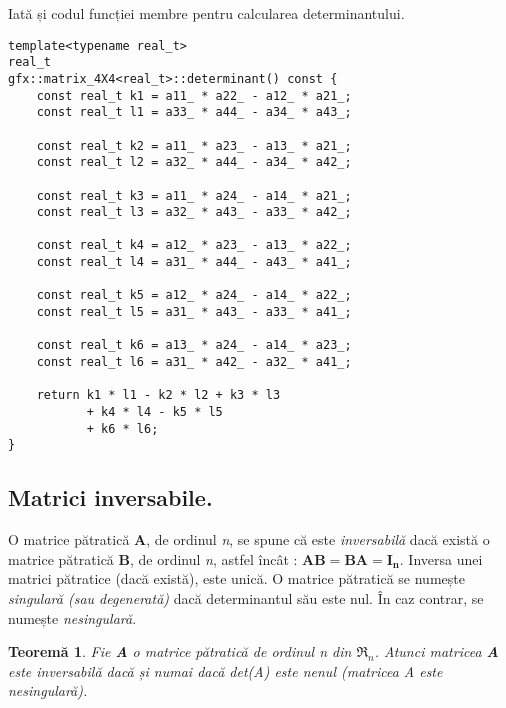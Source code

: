 \noindent
Iată și codul funcției membre pentru calcularea determinantului.
\begin{lstlisting}[]
template<typename real_t>
real_t
gfx::matrix_4X4<real_t>::determinant() const {
    const real_t k1 = a11_ * a22_ - a12_ * a21_;
    const real_t l1 = a33_ * a44_ - a34_ * a43_;

    const real_t k2 = a11_ * a23_ - a13_ * a21_;
    const real_t l2 = a32_ * a44_ - a34_ * a42_;

    const real_t k3 = a11_ * a24_ - a14_ * a21_;
    const real_t l3 = a32_ * a43_ - a33_ * a42_;

    const real_t k4 = a12_ * a23_ - a13_ * a22_;
    const real_t l4 = a31_ * a44_ - a43_ * a41_;

    const real_t k5 = a12_ * a24_ - a14_ * a22_;
    const real_t l5 = a31_ * a43_ - a33_ * a41_;

    const real_t k6 = a13_ * a24_ - a14_ * a23_;
    const real_t l6 = a31_ * a42_ - a32_ * a41_;

    return k1 * l1 - k2 * l2 + k3 * l3 
           + k4 * l4 - k5 * l5 
           + k6 * l6;
}

\end{lstlisting}

\subsection{Matrici inversabile.}
\label{ch1:sec_matrix:sub_matrix_inverse}

O matrice pătratică \textbf{A}, de ordinul \textit{n}, se spune că este
\textit{inversabilă} dacă există o matrice pătratică \textbf{B}, de ordinul
\textit{n}, astfel încât : $\mathbf{AB = BA = I_{n}}$. Inversa unei matrici
pătratice (dacă există), este unică.
O matrice pătratică se numește \textit{singulară (sau degenerată)} dacă
determinantul său este nul. În caz contrar, se numește \textit{nesingulară}.

\newtheorem{th_matrixinverse}[th_detcompute]{Teoremă}
\label{theorem:matrix_inverse}
\begin{th_matrixinverse}
Fie \textbf{A} o matrice pătratică de ordinul \textit{n} din $\mathfrak{R}_{n}$.
Atunci matricea \textbf{A} este inversabilă dacă și numai dacă det(A) este nenul
(matricea A este nesingulară).
\end{th_matrixinverse}

